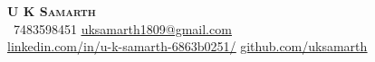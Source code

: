 
\begin{center}
    \textbf{\Huge \scshape U K Samarth} \\ \vspace{1pt}
     \ \small 7483598451 \quad
    \href{mailto:uksamarth1809@gmail.com}{ \underline{uksamarth1809@gmail.com}} \\
    \href{https://www.linkedin.com/in/u-k-samarth-6863b0251/}{ \underline{linkedin.com/in/u-k-samarth-6863b0251/}} \quad
    \href{https://github.com/uksamarth}{ \underline{github.com/uksamarth}}
\end{center}


